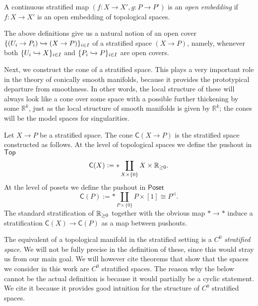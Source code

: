 \documentclass[../text]{subfiles}
\begin{document}
\begin{definition}
    A continuous stratified map $(f: X \rightarrow X', g: P \rightarrow P')$ is an \emph{open embedding} if $f: X \rightarrow X'$ is an open embedding of topological spaces.
\end{definition}

\begin{remark}
    The above definitions give us a natural notion of an open cover $\{ (U_i \rightarrow P_i) \xhookrightarrow{} (X \rightarrow P)\}_{i \in I}$ of a stratified space $(X \rightarrow P)$, namely, whenever both $\{ U_i \xhookrightarrow{} X\}_{i \in I}$ and $\{ P_i \xhookrightarrow{} P \}_{i \in I}$ are open covers.
\end{remark}

Next, we construct the cone of a stratified space. This plays a very important role in the theory of conically smooth manifolds, because it provides the prototypical departure from smoothness. In other words, the local structure of these will always look like a cone over some space with a possible further thickening by some $\mathbb{R}^k$, just as the local structure of smooth manifolds is given by $\mathbb{R}^k$; the cones will be the model spaces for singularities.

\begin{definition}
    Let $X \rightarrow P$ be a stratified space. The cone $\mathsf{C}(X \rightarrow P)$ is the stratified space constructed as follows. At the level of topological spaces we define the pushout in $\mathsf{Top}$
    \begin{equation}
        \mathsf{C}(X) := * \coprod_{X \times \{0\}} X \times \mathbb{R}_{\geq 0}.
    \end{equation}
    At the level of posets we define the pushout in $\mathsf{Poset}$
    \begin{equation}
        \mathsf{C}(P) := * \coprod_{P \times \{ 0\}} P \times [1] \cong P^{\vartriangleleft}.
    \end{equation}
    The standard stratification of $\mathbb{R}_{\geq 0}$ together with the obvious map $* \rightarrow *$ induce a stratification $\mathsf{C}(X) \rightarrow \mathsf{C}(P)$ as a map between pushouts. 
\end{definition}

The equivalent of a topological manifold in the stratified setting is a \emph{$C^0$ stratified space}. We will not be fully precise in the definition of these, since this would stray us from our main goal. We will however cite theorems that show that the spaces we consider in this work are $C^0$ stratified spaces. The reason why the below cannot be the actual definition is because it would partially be a cyclic statement. We cite it because it provides good intuition for the structure of $C^0$ stratified spaces.
\end{document}
